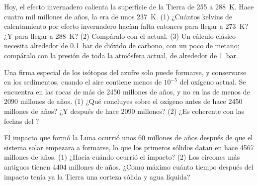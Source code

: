 \begin{exercise}[$\star\star\star$]\label{exo:g12:early-earth:13}
Hoy, el efecto invernadero calienta la superficie de la Tierra de 255 a
\qty{288}{K}. Hace cuatro mil millones de años, la 
era de unos \qty{237}{K}. (1) ¿Cuántos kelvins de calentamiento por efecto
invernadero hacían falta entonces para llegar a \qty{273}{K}? ¿Y para llegar
a \qty{288}{K}? (2) Compáralo con el actual. (3) Un cálculo clásico necesita
alrededor de \qty{0.1}{bar} de dióxido de carbono, con un poco de metano;
compáralo con la presión de toda la atmósfera actual, de alrededor de
\qty{1}{bar}.
\end{exercise}

\begin{exercise}[$\star\star\star$]\label{exo:g12:early-earth:14}
Una firma especial de los isótopos del azufre solo puede formarse, y
conservarse en los sedimentos, cuando el aire contiene menos de $10^{-5}$ del
oxígeno actual. Se encuentra en las rocas de más de 2450 millones de años, y
no en las de menos de 2090 millones de años. (1) ¿Qué concluyes sobre el
oxígeno antes de hace 2450 millones de años? ¿Y después de hace 2090
millones? (2) ¿Es coherente con las fechas del ?
\end{exercise}

\begin{exercise}[$\star\star\star$]\label{exo:g12:early-earth:15}
El impacto que formó la Luna ocurrió unos 60 millones de años después de que
el sistema solar empezara a formarse, lo que los primeros sólidos datan en
hace 4567 millones de años. (1) ¿Hacia cuándo ocurrió el impacto? (2) Los
circones más antiguos tienen \num{4404} millones de años. ¿Como máximo cuánto
tiempo después del impacto tenía ya la Tierra una corteza sólida y agua
líquida?
\end{exercise}

